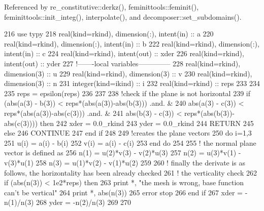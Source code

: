 Referenced by re\+\_\+constitutive\+::derkz(), feminittools\+::feminit(), feminittools\+::init\+\_\+integ(), interpolate(), and decomposer\+::set\+\_\+subdomains().


\begin{DoxyCode}
216     \textcolor{keywordtype}{use }typy
218     \textcolor{keywordtype}{real(kind=rkind)}, \textcolor{keywordtype}{dimension(:)}, \textcolor{keywordtype}{intent(in)} :: a
220     \textcolor{keywordtype}{real(kind=rkind)}, \textcolor{keywordtype}{dimension(:)}, \textcolor{keywordtype}{intent(in)} :: b
222     \textcolor{keywordtype}{real(kind=rkind)}, \textcolor{keywordtype}{dimension(:)}, \textcolor{keywordtype}{intent(in)} :: c
224     \textcolor{keywordtype}{real(kind=rkind)}, \textcolor{keywordtype}{intent(out)} :: xder
226     \textcolor{keywordtype}{real(kind=rkind)}, \textcolor{keywordtype}{intent(out)} :: yder
227     \textcolor{comment}{!-------local variables--------------}
228     \textcolor{keywordtype}{real(kind=rkind)}, \textcolor{keywordtype}{dimension(3)} :: u
229     \textcolor{keywordtype}{real(kind=rkind)}, \textcolor{keywordtype}{dimension(3)} :: v
230     \textcolor{keywordtype}{real(kind=rkind)}, \textcolor{keywordtype}{dimension(3)} :: n
231     \textcolor{keywordtype}{integer(kind=ikind)} :: i
232     \textcolor{keywordtype}{real(kind=rkind)} :: reps
233 
234 
235     reps = epsilon(reps)
236 
237 
238     \textcolor{comment}{!check if the plane is not horizontal}
239     \textcolor{keywordflow}{if} (abs(a(3) - b(3)) < reps*(abs(a(3))-abs(b(3)))  .and.  &
240         abs(a(3) - c(3)) < reps*(abs(a(3))-abs(c(3)))  .and.  &
241         abs(b(3) - c(3)) < reps*(abs(b(3))-abs(c(3)))) \textcolor{keywordflow}{then}
242       xder = 0.0\_rkind
243       yder = 0.0\_rkind
244       \textcolor{keywordflow}{RETURN}
245     \textcolor{keywordflow}{else}
246       \textcolor{keywordflow}{CONTINUE}
247 \textcolor{keywordflow}{    end if}
248 
249     \textcolor{comment}{!creates the plane vectors }
250     \textcolor{keywordflow}{do} i=1,3
251       u(i) = a(i) - b(i)
252       v(i) = a(i) - c(i)
253 \textcolor{keywordflow}{    end do}
254 
255     \textcolor{comment}{! the normal plane vector is defined as}
256     n(1) = u(2)*v(3) - v(2)*u(3)
257     n(2) = u(3)*v(1) - v(3)*u(1)
258     n(3) = u(1)*v(2) - v(1)*u(2)
259 
260     \textcolor{comment}{! finally the derivate is as follows, the horizontality has been already checked}
261     \textcolor{comment}{! the verticality check}
262     \textcolor{keywordflow}{if} (abs(n(3)) < 1e2*reps) \textcolor{keywordflow}{then}
263       print *, \textcolor{stringliteral}{"the mesh is wrong, base function can't be vertical"}
264       print *, abs(n(3))
265       error stop
266 \textcolor{keywordflow}{    end if} 
267     xder = -n(1)/n(3)
268     yder = -n(2)/n(3)
269 
270     
\end{DoxyCode}


